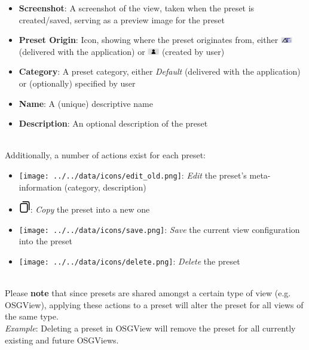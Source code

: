 \begin{itemize}
 \item \textbf{Screenshot}: A screenshot of the view, taken when the preset is created/saved, serving as a preview image for the preset
 \item \textbf{Preset Origin}: Icon, showing where the preset originates from, either \includegraphics[width=0.5cm,frame]{figures/view_presets_origin_openats.png} (delivered with the application) 
 or \includegraphics[width=0.5cm,frame]{figures/view_presets_origin_user.png} (created by user)
 \item \textbf{Category}: A preset category, either \textit{Default} (delivered with the application) or (optionally) specified by user
 \item \textbf{Name}: A (unique) descriptive name
 \item \textbf{Description}: An optional description of the preset
\end{itemize} \ \\

Additionally, a number of actions exist for each preset:

\begin{itemize}
 \item \texttt{[image: ../../data/icons/edit\_old.png]}: \textit{Edit} the preset's meta-information (category, description)
 \item \includegraphics[width=0.5cm,frame]{../../data/icons/copy.png}: \textit{Copy} the preset into a new one
 \item \texttt{[image: ../../data/icons/save.png]}: \textit{Save} the current view configuration into the preset
 \item \texttt{[image: ../../data/icons/delete.png]}: \textit{Delete} the preset
\end{itemize} \ \\

Please \textbf{note} that since presets are shared amongst a certain type of view (e.g. OSGView), applying these actions to a preset 
will alter the preset for all views of the same type. \\

\textit{Example}: Deleting a preset in OSGView will remove the preset for all currently existing and future OSGViews. \\

